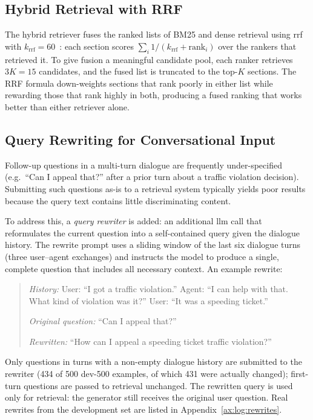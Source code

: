 \subsection{Hybrid Retrieval with RRF}

The hybrid retriever fuses the ranked lists of BM25 and dense retrieval using
\gls{rrf} with $k_{\mathrm{rrf}} = 60$~\cite{cormack2009rrf}: each section scores
$\sum_i 1/(k_{\mathrm{rrf}} + \mathrm{rank}_i)$ over the rankers that retrieved it.
To give fusion a meaningful candidate pool, each ranker retrieves $3K = 15$
candidates, and the fused list is truncated to the top-$K$ sections. The RRF formula down-weights sections that rank poorly in either
list while rewarding those that rank highly in both, producing a fused ranking
that works better than either retriever alone.

\subsection{Query Rewriting for Conversational Input}\label{sec:rag:rewrite}

Follow-up questions in a multi-turn dialogue are frequently under-specified (e.g.\
``Can I appeal that?'' after a prior turn about a traffic violation decision).
Submitting such questions as-is to a retrieval system typically yields poor results
because the query text contains little discriminating content.

To address this, a \emph{query rewriter} is added: an additional \gls{llm} call
that reformulates the current question into a self-contained query given the dialogue
history. The rewrite prompt uses a sliding window of the last six dialogue turns
(three user--agent exchanges) and instructs the model to produce a single, complete question that includes
all necessary context. An example rewrite:

\begin{quote}
\small
\textit{History:} User: ``I got a traffic violation.'' Agent: ``I can help with
that. What kind of violation was it?'' User: ``It was a speeding ticket.''

\textit{Original question:} ``Can I appeal that?''

\textit{Rewritten:} ``How can I appeal a speeding ticket traffic violation?''
\end{quote}

Only questions in turns with a non-empty dialogue history are submitted to the
rewriter (434 of 500 dev-500 examples, of which 431 were actually changed);
first-turn questions are passed to retrieval unchanged. The rewritten query is used
only for retrieval: the generator still receives the original user question.
Real rewrites from the development set are listed in Appendix~\ref{ax:log:rewrites}.


